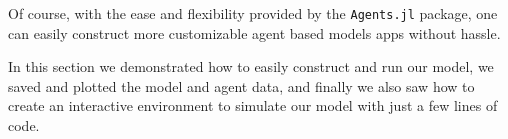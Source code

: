 Of course, with the ease and flexibility provided by the \texttt{Agents.jl} package, one can easily construct more customizable agent based models apps without hassle.

In this section we demonstrated how to easily construct and run our model, we saved and plotted the model and agent data, and finally we also saw how to create an interactive environment to simulate our model with just a few lines of code.